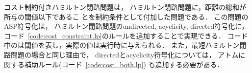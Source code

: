 



コスト制約付きハミルトン閉路問題は，
ハミルトン閉路問題に，距離の総和が所与の閾値以下であるこ
とを制約条件として付加した問題である．
この問題のASP符号化は，
ハミルトン閉路問題の\textsf{undirected}, \textsf{acyclicity},
\textsf{directed}符号化に，
コード~\ref{code:cost_constraint.lp}のルールを追加することで実現できる．
%
コード中のは閾値を表し，実際の値は実行時に与えられる．
また，最短ハミルトン閉路問題の場合と同じ理由で，
\textsf{directed}と\textsf{acyclicity}符号化については，
アトムに関する補助ルール(コード~\ref{code:cost_both.lp})
も追加する必要がある．

